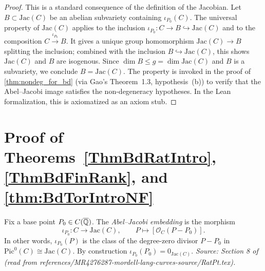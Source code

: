 \begin{proof}
  This is a standard consequence of the definition of the Jacobian.
  Let \(B \subset \mathrm{Jac}(C)\) be an abelian subvariety containing
  \(\iota_{P_0}(C)\). The universal property of \(\mathrm{Jac}(C)\) applies to
  the inclusion \(\iota_{P_0} \colon C \to B \hookrightarrow \mathrm{Jac}(C)\)
  and to the composition \(C \xrightarrow{\iota_{P_0}} B\). It gives a unique
  group homomorphism \(\mathrm{Jac}(C) \to B\) splitting the inclusion; combined
  with the inclusion \(B \hookrightarrow \mathrm{Jac}(C)\), this shows
  \(\mathrm{Jac}(C)\) and \(B\) are isogenous.
  Since \(\dim B \le g = \dim \mathrm{Jac}(C)\) and \(B\) is a subvariety, we
  conclude \(B = \mathrm{Jac}(C)\).
  The property is invoked in the proof of \cref{thm:nondeg_for_bd} (via Gao's
  Theorem~1.3, hypothesis~(b)) to verify that the Abel--Jacobi image satisfies
  the non-degeneracy hypotheses.
  In the Lean formalization, this is axiomatized as an axiom stub.
\end{proof}

\section{Proof of Theorems~\ref{ThmBdRatIntro}, \ref{ThmBdFinRank}, and \ref{thm:BdTorIntroNF}}

\begin{definition}
  \label{def:abel_jacobi}
  Fix a base point \(P_0 \in C(\overline{\mathbb{Q}})\). The \emph{Abel--Jacobi embedding} is the
  morphism
  \[
    \iota_{P_0} \colon C \to \mathrm{Jac}(C), \qquad P \mapsto [\mathcal{O}_C(P - P_0)].
  \]
  In other words, \(\iota_{P_0}(P)\) is the class of the degree-zero divisor \(P - P_0\)
  in \(\mathrm{Pic}^0(C) \cong \mathrm{Jac}(C)\). By construction
  \(\iota_{P_0}(P_0) = 0_{\mathrm{Jac}(C)}\).
  \textit{Source: Section 8 of \cite{MR4276287-mordell-lang-curves} (read from
  references/MR4276287-mordell-lang-curves-source/RatPt.tex).}
\end{definition}

